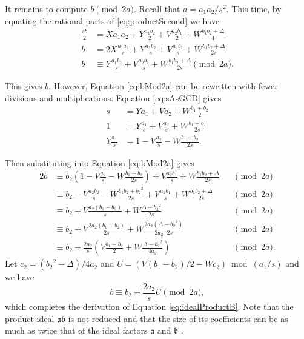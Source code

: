 \documentclass{ucalgthes1}
\theoremstyle{definition}
\begin{document}
It remains to compute $b \pmod{2a}$.  Recall that $a = a_1a_2/s^2$.  This time, by equating the rational parts of \eqref{eq:productSecond} we have
\begin{align}
	\frac{sb}{2} & = Xa_1a_2 + Y\frac{a_1b_2}{2} + V\frac{a_2b_1}{2} + W\frac{b_1b_2 + \Delta}{4} \nonumber \\
	b & = 2X\frac{a_1a_2}{s} + Y\frac{a_1b_2}{s} + V\frac{a_2b_1}{s} + W\frac{b_1b_2 + \Delta}{2s} \nonumber \\
	b & \equiv Y\frac{a_1b_2}{s} + V\frac{a_2b_1}{s} + W\frac{b_1b_2 + \Delta}{2s} \pmod{2a}. \label{eq:bMod2a}
\end{align}

\noindent
This gives $b$.  However, Equation \eqref{eq:bMod2a} can be rewritten with fewer divisions and multiplications.  Equation \eqref{eq:sAsGCD} gives
\begin{align*}
	s & = Ya_1 + Va_2 + W\frac{b_1+b_2}{2} \\
	1 & = Y\frac{a_1}{s} + V\frac{a_2}{s} + W\frac{b_1+b_2}{2s} \\
	Y\frac{a_1}{s} & = 1 - V\frac{a_2}{s} - W\frac{b_1+b_2}{2s}.
\end{align*}

\noindent
Then substituting into Equation \eqref{eq:bMod2a} gives
\begin{alignat*}{2}
	b & \equiv b_2(1-V\frac{a_2}{s} - W\frac{b_1+b_2}{2s}) + V\frac{a_2b_1}{s} + W\frac{b_1b_2 + \Delta}{2s} && \pmod{2a} \\
	& \equiv b_2 - V\frac{a_2b_2}{s} - W\frac{b_1b_2+{b_2}^2}{2s} + V\frac{a_2b_1}{s} + W\frac{b_1b_2 + \Delta}{2s} && \pmod{2a} \\
	& \equiv b_2 + V\frac{a_2(b_1-b_2)}{s} + W\frac{\Delta - {b_2}^2}{2s} && \pmod{2a} \\
	& \equiv b_2 + V\frac{2a_2(b_1-b_2)}{2s} + W\frac{2a_2(\Delta - {b_2}^2)}{2a_2 \cdot 2s} && \pmod{2a} \\
	& \equiv b_2 + \frac{2a_2}{s} \left( V\frac{b_1-b_2}{2} + W\frac{\Delta - {b_2}^2}{4a_2} \right) && \pmod{2a}.
\end{alignat*}
Let $c_2 = ({b_2}^2 - \Delta)/4a_2$ and $U = (V(b_1-b_2)/2 - Wc_2) \bmod{(a_1/s)}$ and we have
\[
	b \equiv b_2 + \frac{2a_2}{s} U \pmod{2a},
\]
which completes the derivation of Equation \eqref{eq:idealProductB}.  Note that the product ideal $\mathfrak a \mathfrak b$ is not reduced and that the size of its coefficients can be as much as twice that of the ideal factors $\mathfrak a$ and $\mathfrak b$ \cite[p.118]{Jacobson2009}.
\end{document}
